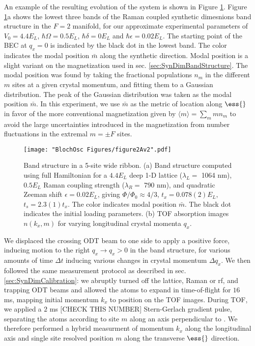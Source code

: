 An example of the resulting evolution of the system is shown in Figure \ref{fig:kickBsTOF}. Figure \ref{fig:kickBsTOF}a shows the lowest three bands of the Raman coupled synthetic dimesnions band structure in the $F=2$ manifold, for our approximate experimental parameters of $V_0 = 4.4 E_L$, $\hbar\Omega = 0.5 E_L$, $\hbar\delta = 0 E_L$ and $\hbar\epsilon = 0.02 E_L$. The starting point of the BEC at $q_x=0$ is indicated by the black dot in the lowest band. The color indicates the modal position $\bar{m}$ along the synthetic direction. Modal position is a slight variant on the magnetization used in sec. \ref{sec:SynDimBandStructure}. The modal position was found by taking the fractional populations $n_{m}$ in the different $m$ sites at a given crystal momentum, and fitting them to a Gaussian distribution. The peak of the Gaussian distribution was taken as the modal position $\bar{m}$. In this experiment, we use $\bar{m}$ as the metric of location along $\ess{}$ in favor of the more conventional magnetization given by $\langle m\rangle=\sum_{m}m n_{m}$ to avoid the large uncertainties introduced in the magnetization from number fluctuations in the extremal $m=\pm F$ sites. 
\begin{figure}
\texttt{[image: "BlochOsc Figures/figure2Av2".pdf]}
\caption[Band structure in a 5-site wide ribbon]{Band structure in a 5-site wide ribbon. (a) Band structure computed using full Hamiltonian for a $4.4 E_L$ deep 1-D lattice ($\lambda_L=$ 1064 nm), $0.5 E_L$ Raman coupling strength ($\lambda_R = $ 790 nm), and quadratic Zeeman shift $\epsilon=0.02 E_L$, giving $\Phi/\Phi_0 \approx 4/3$, $t_x = 0.078(2) E_L$, $t_s=2.3(1) t_x$. The color indicates modal position $\bar{m}$. The black dot indicates the initial loading parameters.  (b) TOF absorption images $n(k_x,m)$ for varying longitudinal crystal momenta $q_x$.  }
\label{fig:kickBsTOF}
\end{figure}

We displaced the crossing ODT beam to one side to apply a positive force, inducing motion to the right $q_x\rightarrow q_x>0$ in the band structure, for various amounts of time $\Delta t$ inducing various changes in crystal momentum $\Delta q_x$. We then followed the same measurement protocol as described in sec. \ref{sec:SynDimCalibration}: we abruptly turned off the lattice, Raman or rf, and trapping ODT beams and allowed the atoms to expand in time-of-flight for $16$ ms, mapping initial momentum $k_x$ to position on the TOF images.  During TOF, we applied a $2$ ms [CHECK THIS NUMBER] Stern-Gerlach gradient pulse, separating the atoms according to site $m$ along an axis perpendicular to \ex{}. We therefore performed a hybrid measurment of momentum $k_x$ along the longitudinal \ex{} axis and single site resolved position $m$ along the transverse $\ess{}$ direction. 

